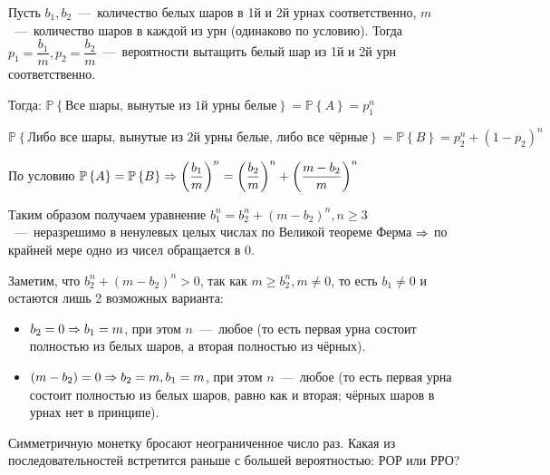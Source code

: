 \documentclass[a4paper,12pt]{article}
\newcommand{\prob}[1]{\mathbb{P}\left\{#1\right\}}
\begin{document}
\begin{solution}
	Пусть $b_1, b_2$~---~количество белых шаров в 1й и 2й урнах соответственно, $m$~---~количество шаров в каждой из урн (одинаково по условию). Тогда $p_1 = \dfrac{b_1}{m}, p_2 = \dfrac{b_2}{m}$~---~вероятности вытащить белый шар из 1й и 2й урн соответственно.
	
	Тогда: $\prob{\text{Все шары, вынутые из 1й урны белые}} = \prob{A} = p_1^n$
	
	$\prob{\text{Либо все шары, вынутые из 2й урны белые, либо все чёрные}} = \prob{B} = p_2^n + (1-p_2)^n$
	
	По условию $\prob{A} = \prob{B} \Ra \left(\dfrac{b_1}{m}\right)^n = \left(\dfrac{b_2}{m}\right)^n + \left(\dfrac{m - b_2}{m}\right)^n$
	
	Таким образом получаем уравнение $b_1^n = b_2^n + (m-b_2)^n, n\ge 3$~---~неразрешимо в ненулевых целых числах по Великой теореме Ферма $\Rightarrow$ по крайней мере одно из чисел обращается в 0.
	
	Заметим, что  $b_2^n + (m-b_2)^n > 0$, так как $m \ge b_2^n, m\ne 0$, то есть $b_1 \neq 0$ и остаются лишь 2 возможных варианта: \begin{itemize}
		\item $b_2 = 0 \Rightarrow b_1 = m$, при этом $n$~---~любое (то есть первая урна состоит полностью из белых шаров, а вторая полностью из чёрных).
		\item $(m-b_2)=0 \Rightarrow b_2 = m, b_1 = m$, при этом $n$~---~любое (то есть первая урна состоит полностью из белых шаров, равно как и вторая; чёрных шаров в урнах нет в принципе).
	\end{itemize}
\end{solution}

\begin{tasknum}{4}
	Симметричную монетку бросают неограниченное число раз. Какая из последовательностей встретится раньше с большей вероятностью: РОР или РРО?
\end{tasknum}
\end{document}

